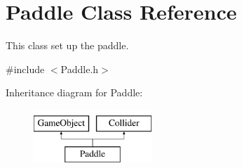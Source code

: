 \hypertarget{class_paddle}{}\section{Paddle Class Reference}
\label{class_paddle}


This class set up the paddle.  




{\ttfamily \#include $<$Paddle.\+h$>$}

Inheritance diagram for Paddle\+:\begin{figure}[H]
\begin{center}
\leavevmode
\includegraphics[height=2.000000cm]{class_paddle}
\end{center}
\end{figure}

